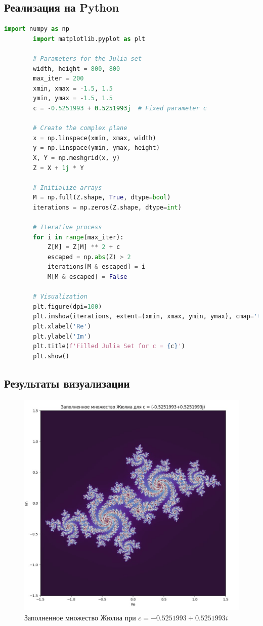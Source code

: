 \documentclass{article}
\begin{document}
	\subsection{Реализация на Python}
	
	\begin{lstlisting}[language=Python, inputencoding=utf8]
		import numpy as np
		import matplotlib.pyplot as plt
		
		# Parameters for the Julia set
		width, height = 800, 800
		max_iter = 200
		xmin, xmax = -1.5, 1.5
		ymin, ymax = -1.5, 1.5
		c = -0.5251993 + 0.5251993j  # Fixed parameter c
		
		# Create the complex plane
		x = np.linspace(xmin, xmax, width)
		y = np.linspace(ymin, ymax, height)
		X, Y = np.meshgrid(x, y)
		Z = X + 1j * Y
		
		# Initialize arrays
		M = np.full(Z.shape, True, dtype=bool)
		iterations = np.zeros(Z.shape, dtype=int)
		
		# Iterative process
		for i in range(max_iter):
			Z[M] = Z[M] ** 2 + c
			escaped = np.abs(Z) > 2
			iterations[M & escaped] = i
			M[M & escaped] = False
		
		# Visualization
		plt.figure(dpi=100)
		plt.imshow(iterations, extent=(xmin, xmax, ymin, ymax), cmap='twilight_shifted')
		plt.xlabel('Re')
		plt.ylabel('Im')
		plt.title(f'Filled Julia Set for c = {c}')
		plt.show()
	\end{lstlisting}
	
	\newpage
	
	\subsection{Результаты визуализации}
	\begin{figure}[H]
		\centering
		\includegraphics[width=0.8\linewidth]{images/screenshot002}
		\caption{Заполненное множество Жюлиа при $c = -0.5251993 + 0.5251993i$}
		\label{fig:julia}
	\end{figure}
	
\end{document}
